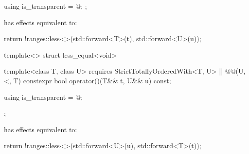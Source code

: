 {\begin{itemdecl}
{  using is_transparent = @\unspecnc@;
};
\end{itemdecl}

\begin{itemdescr}
\pnum
{} has effects equivalent to:
\begin{codeblock}
return !ranges::less<>{}(std::forward<T>(t), std::forward<U>(u));
\end{codeblock}
\end{itemdescr}

%
\begin{itemdecl}
template<> struct less_equal<void> {
  template<class T, class U>
    requires StrictTotallyOrderedWith<T, U> || @\textit{}@(U, <, T)
  constexpr bool operator()(T&& t, U&& u) const;

  using is_transparent = @\unspecnc@;
};
\end{itemdecl}

\begin{itemdescr}
\pnum
{} has effects equivalent to:
\begin{codeblock}
return !ranges::less<>{}(std::forward<U>(u), std::forward<T>(t));
\end{codeblock}
\end{itemdescr}
} %

